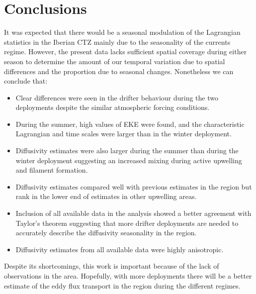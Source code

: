 \section{Conclusions}
It was expected that there would be a seasonal modulation of the
Lagrangian statistics in the Iberian CTZ mainly due to the
seasonality of the currents regime. However, the present data
lacks sufficient spatial coverage during either season to
determine the amount of our temporal variation due to spatial
differences and the proportion due to seasonal changes.
Nonetheless we can conclude that:
\begin{itemize}
\item Clear differences were seen in the drifter behaviour during
the two deployments despite the similar atmospheric forcing
conditions.
\item During the summer, high values of EKE were found, and the
characteristic Lagrangian and time scales were larger than in the
winter deployment.
\item Diffusivity estimates were also larger during the summer than
during the winter deployment suggesting an increased mixing during
active upwelling and filament formation.
\item Diffusivity estimates compared well with previous estimates
in the region but rank in the lower end of estimates in other
upwelling areas.
\item Inclusion of all available data in the analysis showed a
better agreement with Taylor's theorem suggesting that more
drifter deployments are needed to accurately describe the
diffusivity seasonality in the region.
\item Diffusivity estimates from all available data were highly
anisotropic.
\end{itemize}

Despite its shortcomings, this work is important because of the
lack of observations in the area. Hopefully, with more deployments
there will be a better estimate of the eddy flux transport in the
region during the different regimes.
